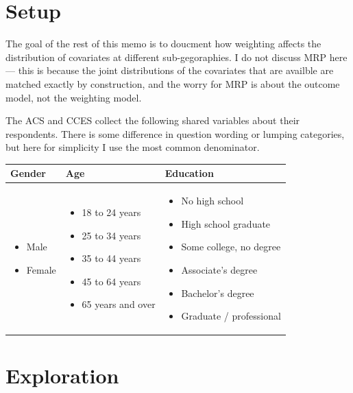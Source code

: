 \documentclass[11pt]{article}
\begin{document}
\section*{Setup}

The goal of the rest of this memo is to doucment how weighting affects the distribution of covariates at different sub-gegoraphies. I do not discuss MRP here --- this is because the joint distributions of the covariates that are availble are matched exactly by construction, and the worry for MRP is about the outcome model, not the weighting model.

The ACS and CCES collect the following shared variables about their respondents. There is some difference in question wording or lumping categories, but here for simplicity I use the most common denominator.


\begin{table}[!h]
\small
\begin{tabularx}{\linewidth}{XXX}
Gender & Age & Education\\\midrule
\begin{itemize}
\item Male
\item Female
\end{itemize} &
\begin{itemize}
\item 18 to 24 years
\item 25 to 34 years
\item 35 to 44 years
\item 45 to 64 years
\item 65 years and over
\end{itemize} &
\begin{itemize}
\item No high school
\item High school graduate
\item Some college, no degree
\item Associate's degree
\item Bachelor's degree
\item Graduate / professional
\end{itemize}
\end{tabularx}
\end{table}


\section*{Exploration}
\end{document}

